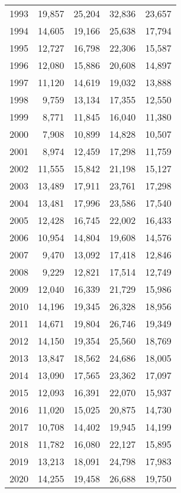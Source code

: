 \documentclass[11pt]{book}
\begin{document}
\begin{longtable}[]{@{}lrrrr@{}}
1993 & 19,857 & 25,204 & 32,836 & 23,657\tabularnewline
1994 & 14,605 & 19,166 & 25,638 & 17,794\tabularnewline
1995 & 12,727 & 16,798 & 22,306 & 15,587\tabularnewline
1996 & 12,080 & 15,886 & 20,608 & 14,897\tabularnewline
1997 & 11,120 & 14,619 & 19,032 & 13,888\tabularnewline
1998 & 9,759 & 13,134 & 17,355 & 12,550\tabularnewline
1999 & 8,771 & 11,845 & 16,040 & 11,380\tabularnewline
2000 & 7,908 & 10,899 & 14,828 & 10,507\tabularnewline
2001 & 8,974 & 12,459 & 17,298 & 11,759\tabularnewline
2002 & 11,555 & 15,842 & 21,198 & 15,127\tabularnewline
2003 & 13,489 & 17,911 & 23,761 & 17,298\tabularnewline
2004 & 13,481 & 17,996 & 23,586 & 17,540\tabularnewline
2005 & 12,428 & 16,745 & 22,002 & 16,433\tabularnewline
2006 & 10,954 & 14,804 & 19,608 & 14,576\tabularnewline
2007 & 9,470 & 13,092 & 17,418 & 12,846\tabularnewline
2008 & 9,229 & 12,821 & 17,514 & 12,749\tabularnewline
2009 & 12,040 & 16,339 & 21,729 & 15,986\tabularnewline
2010 & 14,196 & 19,345 & 26,328 & 18,956\tabularnewline
2011 & 14,671 & 19,804 & 26,746 & 19,349\tabularnewline
2012 & 14,150 & 19,354 & 25,560 & 18,769\tabularnewline
2013 & 13,847 & 18,562 & 24,686 & 18,005\tabularnewline
2014 & 13,090 & 17,565 & 23,362 & 17,097\tabularnewline
2015 & 12,093 & 16,391 & 22,070 & 15,937\tabularnewline
2016 & 11,020 & 15,025 & 20,875 & 14,730\tabularnewline
2017 & 10,708 & 14,402 & 19,945 & 14,199\tabularnewline
2018 & 11,782 & 16,080 & 22,127 & 15,895\tabularnewline
2019 & 13,213 & 18,091 & 24,798 & 17,983\tabularnewline
2020 & 14,255 & 19,458 & 26,688 & 19,750\tabularnewline
\bottomrule
\end{longtable}
\clearpage
\end{document}
